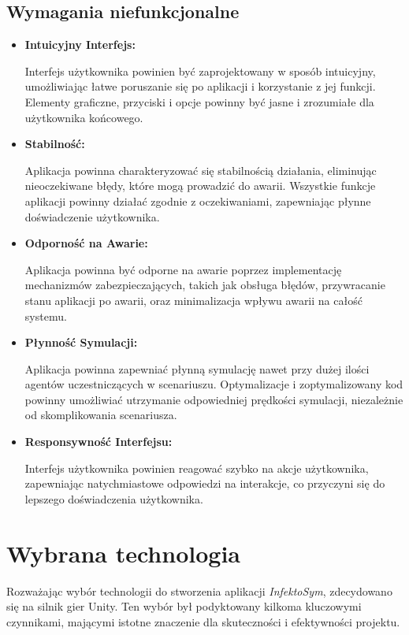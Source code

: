 \subsection{\textbf{Wymagania niefunkcjonalne}}
\begin{itemize}
	\item\textbf{  Intuicyjny Interfejs:}
	
	Interfejs użytkownika powinien być zaprojektowany w sposób intuicyjny, umożliwiając łatwe poruszanie się po aplikacji i korzystanie z jej funkcji. Elementy graficzne, przyciski i opcje powinny być jasne i zrozumiałe dla użytkownika końcowego.
	\item\textbf{ Stabilność:}
	
	Aplikacja powinna charakteryzować się stabilnością działania, eliminując nieoczekiwane błędy, które mogą prowadzić do awarii. Wszystkie funkcje aplikacji powinny działać zgodnie z oczekiwaniami, zapewniając płynne doświadczenie użytkownika.
	\item\textbf{ Odporność na Awarie:}
	
	Aplikacja powinna być odporne na awarie poprzez implementację mechanizmów zabezpieczających, takich jak obsługa błędów, przywracanie stanu aplikacji po awarii, oraz minimalizacja wpływu awarii na całość systemu.
	
	\item \textbf{Płynność Symulacji:}
	
	Aplikacja powinna zapewniać płynną symulację nawet przy dużej ilości agentów uczestniczących w scenariuszu. Optymalizacje i zoptymalizowany kod powinny umożliwiać utrzymanie odpowiedniej prędkości symulacji, niezależnie od skomplikowania scenariusza.
	
	\item\textbf{ Responsywność Interfejsu:}
	
	Interfejs użytkownika powinien reagować szybko na akcje użytkownika, zapewniając natychmiastowe odpowiedzi na interakcje, co przyczyni się do lepszego doświadczenia użytkownika.
\end{itemize}
\section{\textbf{Wybrana technologia}}

Rozważając wybór technologii do stworzenia aplikacji \textit{InfektoSym}, zdecydowano się na silnik gier Unity. Ten wybór był podyktowany kilkoma kluczowymi czynnikami, mającymi istotne znaczenie dla skuteczności i efektywności projektu.

